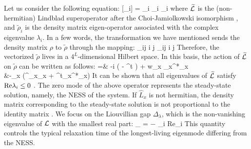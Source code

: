 Let us consider the following equation:
	[\widetilde \rho_i] = \lambda_i \widetilde \rho_i \cm
	\qquad \lambda_i \in {} \pc
\ea
where $\widetilde {\cal L}$ is the (non-hermitian) Lindblad superoperator after the 
Choi-Jamiolkowski isomorphism 
\cite{BP-openquantumsystembook, VZ-2004-superoperatorvidal}, and $\widetilde \rho_i$ is the
density matrix eigen-operator associated with the complex eigenvalue $\lambda_i$.
In a few words, the transformation we have mentioned sends the density matrix $\rho$ to 
$\widetilde \rho$ through the mapping:
	\rho_{ij} \ket i \bra j  \longrightarrow  \widetilde \rho_{ij} \ket i \ket j \pt
\ee
Therefore, the vectorized $\widetilde \rho$ lives in a $4^L$-dimensional Hilbert space.
In this basis, the action of $\widetilde{\cal L}$ on 
$\widetilde \rho$ can be written as follows:
	 =& -i \big( \otimes {} 
		- \otimes {}^t \big) + 
		w\sum_{x }_{x}\otimes {}^*_{x}\\
	&-\sum_{x }\big(^{\dagger}_{x}_{x}
		\otimes{}+
			\otimes\hat{L}^t_{x}^*_{x}\big) \pt
\ea
It can be shown that all eigenvalues of $\widetilde{\cal L}$ satisfy 
$ {\rm Re}{\lambda_i } \le 0$ \cite{BP-openquantumsystembook}. The zero mode of the above 
operator represents the steady-state solution, namely, the NESS of the system. 
If $\hat L_x$ is not hermitian, the density matrix corresponding to the steady-state 
solution is not proportional to the identity matrix \cite{KS-2020-boundarydephasing}. 
We focus on the Liouvillian gap $\Delta_{\lambda}$, which is the non-vanishing eigenvalue
of ${\cal L}$ with the smallest real part:
\Delta_{\lambda} = − \max_{i} {\rm Re}{\lambda_i } \pt
\ea
This quantity controls the typical relaxation time of the longest-living 
eigenmode differing from the NESS.
